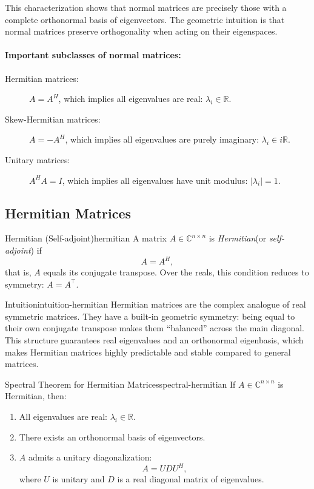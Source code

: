 \documentclass[../../main.tex]{subfiles}
\begin{document}
This characterization shows that normal matrices are precisely those with a complete orthonormal basis of eigenvectors. The geometric intuition is that normal matrices preserve orthogonality when acting on their eigenspaces.

\paragraph{Important subclasses of normal matrices:}
\begin{description}
    \item[Hermitian matrices:] $A = A^H$, which implies all eigenvalues are real: $\lambda_i \in \mathbb{R}$.
    \item[Skew-Hermitian matrices:] $A = -A^H$, which implies all eigenvalues are purely imaginary: $\lambda_i \in i\mathbb{R}$.
    \item[Unitary matrices:] $A^H A = I$, which implies all eigenvalues have unit modulus: $|\lambda_i| = 1$.
\end{description}

\subsection{Hermitian Matrices}

\begin{definition}{Hermitian (Self-adjoint)}{hermitian}
    A matrix $A \in \mathbb{C}^{n \times n}$ is \emph{Hermitian}(or \emph{self-adjoint}) if
    \[
        A = A^H,
    \]
    that is, $A$ equals its conjugate transpose. Over the reals, this condition reduces to symmetry: $A = A^\top$.
\end{definition}

\begin{remark}{Intuition}{intuition-hermitian}
    Hermitian matrices are the complex analogue of real symmetric matrices.
    They have a built-in geometric symmetry: being equal to their own conjugate transpose makes them “balanced” across the main diagonal.
    This structure guarantees real eigenvalues and an orthonormal eigenbasis, which makes Hermitian matrices highly predictable and stable compared to general matrices.
\end{remark}

\begin{theorem}{Spectral Theorem for Hermitian Matrices}{spectral-hermitian}
    If $A \in \mathbb{C}^{n \times n}$ is Hermitian, then:
    \begin{enumerate}
        \item All eigenvalues are real: $\lambda_i \in \mathbb{R}$.
        \item There exists an orthonormal basis of eigenvectors.
        \item $A$ admits a unitary diagonalization:
              \[
                  A = U D U^H,
              \]
              where $U$ is unitary and $D$ is a real diagonal matrix of eigenvalues.
    \end{enumerate}
\end{theorem}
\end{document}
